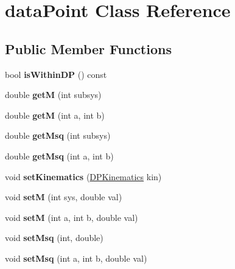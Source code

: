 \hypertarget{classdata_point}{\section{data\-Point Class Reference}
\label{classdata_point}
}
\subsection*{Public Member Functions}
\begin{DoxyCompactItemize}
\item 
\hypertarget{classdata_point_a0e8cad4824da9d2c288e385eb393238d}{bool {\bfseries is\-Within\-D\-P} () const }\label{classdata_point_a0e8cad4824da9d2c288e385eb393238d}

\item 
\hypertarget{classdata_point_af606c164d07c0f1190de6073afd14e26}{double {\bfseries get\-M} (int subsys)}\label{classdata_point_af606c164d07c0f1190de6073afd14e26}

\item 
\hypertarget{classdata_point_af9c2ca141d8a6612599f49ac6f7f9b4b}{double {\bfseries get\-M} (int a, int b)}\label{classdata_point_af9c2ca141d8a6612599f49ac6f7f9b4b}

\item 
\hypertarget{classdata_point_a1613144978fc129412107c88d7ff6324}{double {\bfseries get\-Msq} (int subsys)}\label{classdata_point_a1613144978fc129412107c88d7ff6324}

\item 
\hypertarget{classdata_point_a37d3841951fb94f3f45a881a8f9ee588}{double {\bfseries get\-Msq} (int a, int b)}\label{classdata_point_a37d3841951fb94f3f45a881a8f9ee588}

\item 
\hypertarget{classdata_point_a5ecde24cbfb9494feb839c7897c6058c}{void {\bfseries set\-Kinematics} (\hyperlink{class_d_p_kinematics}{D\-P\-Kinematics} kin)}\label{classdata_point_a5ecde24cbfb9494feb839c7897c6058c}

\item 
\hypertarget{classdata_point_ad1ec2de268930e6ef0b5c4d3e3a46ed5}{void {\bfseries set\-M} (int sys, double val)}\label{classdata_point_ad1ec2de268930e6ef0b5c4d3e3a46ed5}

\item 
\hypertarget{classdata_point_a9c728cce263d1cb01a620a7d202dbe78}{void {\bfseries set\-M} (int a, int b, double val)}\label{classdata_point_a9c728cce263d1cb01a620a7d202dbe78}

\item 
\hypertarget{classdata_point_a05474fc130fa6dfa8397cb53fe7bc90a}{void {\bfseries set\-Msq} (int, double)}\label{classdata_point_a05474fc130fa6dfa8397cb53fe7bc90a}

\item 
\hypertarget{classdata_point_a9a9a83be629cd8e26c8805a5b85b1bbe}{void {\bfseries set\-Msq} (int a, int b, double val)}\label{classdata_point_a9a9a83be629cd8e26c8805a5b85b1bbe}

\end{DoxyCompactItemize}
